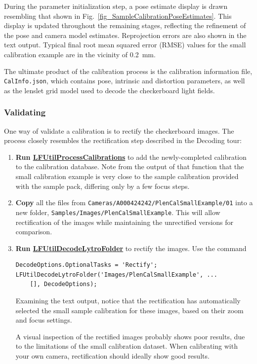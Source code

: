 \documentclass[onecolumn]{article}
\newcommand{\CiteFunc}[1]{\hyperlink{#1}{\small #1}}
\newcommand{\SymbolText}[1]{\texttt{\small #1}}
\begin{document}
\begin{enumerate}[leftmargin=1.5em,rightmargin=0.5cm]
During the parameter initialization step, a pose estimate display is drawn resembling that shown in  Fig.~\ref{fig_SampleCalibrationPoseEstimates}. This display is updated throughout the remaining stages, reflecting the refinement of the pose and camera model estimates.  Reprojection errors are also shown in the text output.  Typical final root mean squared error (RMSE) values for the small calibration example are in the vicinity of 0.2~mm. 

The ultimate product of the calibration process is the calibration information file, \SymbolText{CalInfo.json}, which contains pose, intrinsic and distortion parameters, as well as the lenslet grid model used to decode the checkerboard light fields.

\end{enumerate}

\subsubsection{Validating}

One way of validate a calibration is to rectify the checkerboard images. The process closely resembles the rectification step described in the Decoding tour:

\begin{enumerate}[leftmargin=1.5em,rightmargin=0.5cm]

\item \textbf{Run \CiteFunc{LFUtilProcessCalibrations}} to add the newly-completed calibration to the calibration database.  Note from the output of that function that the small calibration example is very close to the sample calibration provided with the sample pack, differing only by a few focus steps.

\item \textbf{Copy} all the files from \SymbolText{Cameras/A000424242/PlenCalSmallExample/01} into a new folder, \SymbolText{Samples/Images/PlenCalSmallExample}. This will allow rectification of the images while maintaining the unrectified versions for comparison.

\item \textbf{Run \CiteFunc{LFUtilDecodeLytroFolder}} to rectify the images.  Use the command
\begin{Verbatim}
DecodeOptions.OptionalTasks = 'Rectify';
LFUtilDecodeLytroFolder('Images/PlenCalSmallExample', ...
    [], DecodeOptions);
\end{Verbatim}

Examining the text output, notice that the rectification has automatically selected the small sample calibration for these images, based on their zoom and focus settings.

A visual inspection of the rectified images probably shows poor results, due to the limitations of the small calibration dataset.  When calibrating with your own camera, rectification should ideally show good results.

\end{enumerate}
\end{document}
